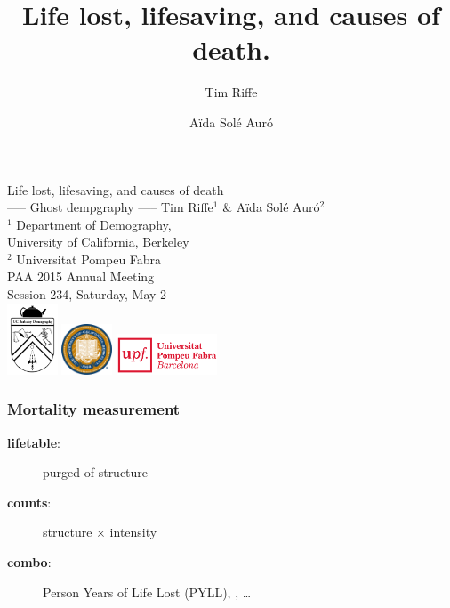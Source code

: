\documentclass{beamer}
\title[Years Lost]{Life lost, lifesaving, and causes of death.}
\author[Riffe \& Sol\'{e}]
{
Tim Riffe \inst{1} \and A{\"i}da Sol\'{e} Aur\'{o} \inst{2}}
\institute %
{
  \inst{1}%
  Department of Demography, \\
  University of California, Berkeley \\
  \and
  \inst{2} Universitat Pompeu Fabra
}
\begin{document}

\begin{frame}[plain]

\vspace{3em}
\LARGE Life lost, lifesaving, and causes of death\\
----- Ghost dempgraphy -----
\vspace{3 mm}
\normalsize Tim Riffe$^1$ \& A{\"i}da Sol\'{e} Aur\'{o}$^2$\\
\vspace{3 mm}
 $^1$ Department of Demography, \\
  \hspace{2mm} University of California, Berkeley \\
  $^2$ Universitat Pompeu Fabra\\
  \vspace{5 mm}
  PAA 2015 Annual Meeting \\
  Session 234, Saturday, May 2\\
  \vspace{5 mm}
  \includegraphics[width=1.5cm]{Figures/demogcrest}\hspace{.5cm}
  \includegraphics[width=1.5cm]{Figures/ucbseal1}\hspace{3cm}
  \includegraphics[height=1.2cm]{Figures/UPFcmyk}
\end{frame}

\begin{frame}
\frametitle{Mortality measurement}
\begin{description}
\item[\textbf{lifetable}:] purged of structure
\item[\textbf{counts}:] structure $\times$ intensity
\item[\textbf{combo}:] Person Years of Life Lost (PYLL),
\underline{\hspace{1cm}},
\ldots
\end{description}

\end{frame}
\end{document}
